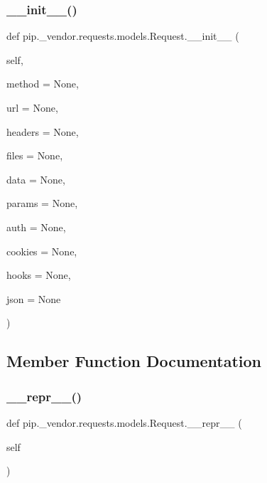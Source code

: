 \subsubsection{\texorpdfstring{\+\_\+\+\_\+init\+\_\+\+\_\+()}{\_\_init\_\_()}}
{\footnotesize\ttfamily def pip.\+\_\+vendor.\+requests.\+models.\+Request.\+\_\+\+\_\+init\+\_\+\+\_\+ (\begin{DoxyParamCaption}\item[{}]{self,  }\item[{}]{method = {\ttfamily None},  }\item[{}]{url = {\ttfamily None},  }\item[{}]{headers = {\ttfamily None},  }\item[{}]{files = {\ttfamily None},  }\item[{}]{data = {\ttfamily None},  }\item[{}]{params = {\ttfamily None},  }\item[{}]{auth = {\ttfamily None},  }\item[{}]{cookies = {\ttfamily None},  }\item[{}]{hooks = {\ttfamily None},  }\item[{}]{json = {\ttfamily None} }\end{DoxyParamCaption})}



\subsection{Member Function Documentation}
\mbox{\label{classpip_1_1__vendor_1_1requests_1_1models_1_1Request_a932d3ee07b7e2f0e45f6b59fbffc90d6}} 
\subsubsection{\texorpdfstring{\+\_\+\+\_\+repr\+\_\+\+\_\+()}{\_\_repr\_\_()}}
{\footnotesize\ttfamily def pip.\+\_\+vendor.\+requests.\+models.\+Request.\+\_\+\+\_\+repr\+\_\+\+\_\+ (\begin{DoxyParamCaption}\item[{}]{self }\end{DoxyParamCaption})}

